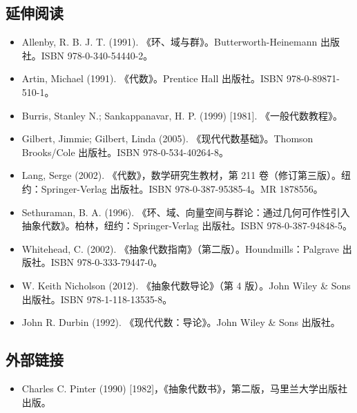 \subsection{延伸阅读}
\begin{itemize}
\item Allenby, R. B. J. T. (1991). 《环、域与群》。Butterworth-Heinemann 出版社。ISBN 978-0-340-54440-2。
\item Artin, Michael (1991). 《代数》。Prentice Hall 出版社。ISBN 978-0-89871-510-1。
\item Burris, Stanley N.; Sankappanavar, H. P. (1999) [1981]. 《一般代数教程》。
\item Gilbert, Jimmie; Gilbert, Linda (2005). 《现代代数基础》。Thomson Brooks/Cole 出版社。ISBN 978-0-534-40264-8。
\item Lang, Serge (2002). 《代数》，数学研究生教材，第 211 卷（修订第三版）。纽约：Springer-Verlag 出版社。ISBN 978-0-387-95385-4。MR 1878556。
\item Sethuraman, B. A. (1996). 《环、域、向量空间与群论：通过几何可作性引入抽象代数》。柏林，纽约：Springer-Verlag 出版社。ISBN 978-0-387-94848-5。
\item Whitehead, C. (2002). 《抽象代数指南》（第二版）。Houndmills：Palgrave 出版社。ISBN 978-0-333-79447-0。
\item W. Keith Nicholson (2012). 《抽象代数导论》（第 4 版）。John Wiley & Sons 出版社。ISBN 978-1-118-13535-8。
\item John R. Durbin (1992). 《现代代数：导论》。John Wiley & Sons 出版社。
\end{itemize}
\subsection{外部链接}
\begin{itemize}
\item Charles C. Pinter (1990) [1982]，《抽象代数书》，第二版，马里兰大学出版社出版。
\end{itemize}